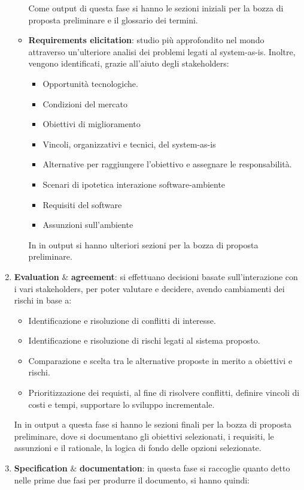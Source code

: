 \begin{enumerate}
\begin{itemize}
        Come output di questa fase si hanno le sezioni iniziali per la bozza di proposta preliminare e il glossario dei termini.
        \item \textbf{Requirements elicitation}: studio più approfondito nel mondo attraverso un'ulteriore analisi dei problemi legati al system-as-is. Inoltre, vengono identificati, grazie all'aiuto degli stakeholders:
        \begin{itemize}
            \item Opportunità tecnologiche.
            \item Condizioni del mercato
            \item Obiettivi di miglioramento
            \item Vincoli, organizzativi e tecnici, del system-as-is
            \item Alternative per raggiungere l'obiettivo e assegnare le responsabilità.
            \item Scenari di ipotetica interazione software-ambiente
            \item Requisiti del software
            \item Assunzioni sull'ambiente
        \end{itemize}
        In in output si hanno ulteriori sezioni per la bozza di proposta preliminare.
    \end{itemize}
    \item \textbf{Evaluation} $\&$ \textbf{agreement}: si effettuano decisioni basate sull'interazione con i vari stakeholders, per poter valutare e decidere, avendo cambiamenti dei rischi in base a:
    \begin{itemize}
        \item Identificazione e risoluzione di conflitti di interesse.
        \item Identificazione e risoluzione di rischi legati al sistema proposto.
        \item Comparazione e scelta tra le alternative proposte in merito a obiettivi e rischi.
        \item Prioritizzazione dei requisti, al fine di risolvere conflitti, definire vincoli di costi e tempi, supportare lo sviluppo incrementale.
    \end{itemize}
    In in output a questa fase si hanno le sezioni finali per la bozza di proposta preliminare, dove si documentano gli obiettivi selezionati, i requisiti, le assunzioni e il rationale, la logica di fondo delle opzioni selezionate.
    \item \textbf{Specification} $\&$ \textbf{documentation}: in questa fase si raccoglie quanto detto nelle prime due fasi per produrre il documento, si hanno quindi:

\end{enumerate}
